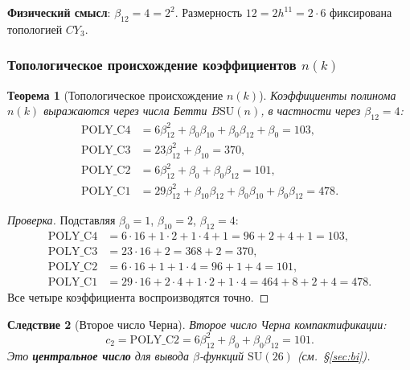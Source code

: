 \documentclass[11pt,a4paper]{article}
\newcommand{\SU}{\ensuremath{\mathrm{SU}}}
\newcommand{\CY}{\ensuremath{CY_3}}
\newcommand{\cTwo}{\ensuremath{c_2}}
\newtheorem{theorem}{Теорема}[section]
\newtheorem{corollary}[theorem]{Следствие}
\theoremstyle{definition}
\begin{document}
\medskip\noindent
\textbf{Физический смысл}: $\beta_{12} = 4 = 2^2$. Размерность
$12 = 2 h^{11} = 2 \cdot 6$ фиксирована топологией $\CY$.

\subsubsection{Топологическое происхождение коэффициентов \texorpdfstring{$n(k)$}{n(k)}}
\label{subsec:betti-coeffs}

\begin{theorem}[Топологическое происхождение $n(k)$]
\label{thm:master-poly-topology}
Коэффициенты полинома $n(k)$ выражаются через числа Бетти
$B\SU(n)$, в частности через $\beta_{12} = 4$:
\begin{align}
    \text{POLY\_C4} &= 6 \beta_{12}^2 + \beta_0 \beta_{10}
                      + \beta_0 \beta_{12} + \beta_0 = 103,
    \label{eq:poly-c4} \\
    \text{POLY\_C3} &= 23 \beta_{12}^2 + \beta_{10} = 370,
    \label{eq:poly-c3} \\
    \text{POLY\_C2} &= 6 \beta_{12}^2 + \beta_0 + \beta_0 \beta_{12} = 101,
    \label{eq:poly-c2} \\
    \text{POLY\_C1} &= 29 \beta_{12}^2 + \beta_{10} \beta_{12}
                      + \beta_0 \beta_{10} + \beta_0 \beta_{12} = 478.
    \label{eq:poly-c1}
\end{align}
\end{theorem}

\begin{proof}[Проверка]
Подставляя $\beta_0 = 1$, $\beta_{10} = 2$, $\beta_{12} = 4$:
\begin{align}
    \text{POLY\_C4} &= 6 \cdot 16 + 1 \cdot 2 + 1 \cdot 4 + 1
                      = 96 + 2 + 4 + 1 = 103, \\
    \text{POLY\_C3} &= 23 \cdot 16 + 2 = 368 + 2 = 370, \\
    \text{POLY\_C2} &= 6 \cdot 16 + 1 + 1 \cdot 4 = 96 + 1 + 4 = 101, \\
    \text{POLY\_C1} &= 29 \cdot 16 + 2 \cdot 4 + 1 \cdot 2 + 1 \cdot 4
                      = 464 + 8 + 2 + 4 = 478.
\end{align}
Все четыре коэффициента воспроизводятся точно.
\end{proof}

\begin{corollary}[Второе число Черна]
\label{cor:c2}
Второе число Черна компактификации:
\begin{equation}
    \boxed{
    \cTwo = \text{POLY\_C2} = 6 \beta_{12}^2 + \beta_0 + \beta_0 \beta_{12} = 101.
    }
    \label{eq:c2}
\end{equation}
Это \textbf{центральное число} для вывода $\beta$-функций $\SU(26)$
(см.~\S\ref{sec:bi}).
\end{corollary}
\end{document}
